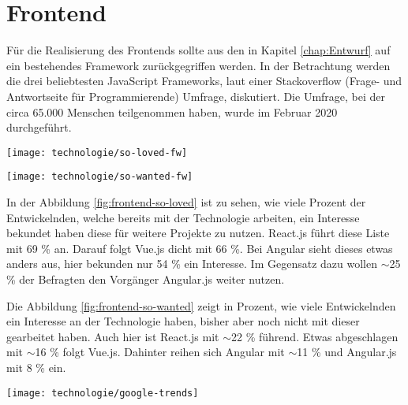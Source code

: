 \section{Frontend} \label{sec:Frontend}
Für die Realisierung des Frontends sollte aus den in Kapitel \ref{chap:Entwurf} auf ein bestehendes Framework zurückgegriffen werden. In der Betrachtung werden die drei beliebtesten JavaScript Frameworks, laut einer Stackoverflow (Frage- und Antwortseite für Programmierende) Umfrage, diskutiert. Die Umfrage, bei der circa 65.000 Menschen teilgenommen haben, wurde im Februar 2020 durchgeführt.\cite{stackexchangeStackOverflowDeveloper2020}

\begin{center}
	\texttt{[image: technologie/so-loved-fw]}
	\label{fig:frontend-so-loved}
\end{center}

\begin{center}
	\texttt{[image: technologie/so-wanted-fw]}
	\label{fig:frontend-so-wanted}
\end{center}

In der Abbildung \ref{fig:frontend-so-loved} ist zu sehen, wie viele Prozent der Entwickelnden, welche bereits mit der Technologie arbeiten, ein Interesse bekundet haben diese für weitere Projekte zu nutzen. React.js führt diese Liste mit 69 \% an. Darauf folgt Vue.js dicht mit 66 \%. Bei Angular sieht dieses etwas anders aus, hier bekunden nur 54 \% ein Interesse. Im Gegensatz dazu wollen $\sim$25 \% der Befragten den Vorgänger Angular.js weiter nutzen.

Die Abbildung \ref{fig:frontend-so-wanted} zeigt in Prozent, wie viele Entwickelnden ein Interesse an der Technologie haben, bisher aber noch nicht mit dieser gearbeitet haben. Auch hier ist React.js mit $\sim$22 \% führend. Etwas abgeschlagen mit $\sim$16 \% folgt Vue.js. Dahinter reihen sich Angular mit $\sim$11 \% und Angular.js mit 8 \% ein.

\begin{center}
	\texttt{[image: technologie/google-trends]}
	\label{fig:frontend-google-trends}
\end{center}


